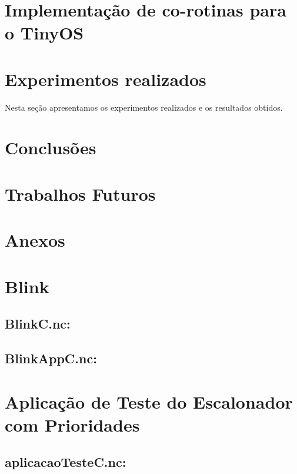 \documentclass[a4paper, 10pt]{article}
\begin{document}
\section{Implementação de co-rotinas para o TinyOS}


\section{Experimentos realizados}\label{resultados}
Nesta seção apresentamos os experimentos realizados e os resultados obtidos.



\section{Conclusões}\label{conclusoes}


\section{Trabalhos Futuros}
\section{Anexos}
\appendix
\section{Blink}\label{a:Blink}
\subsection{BlinkC.nc:}


\subsection{BlinkAppC.nc:}


\section{Aplicação de Teste do Escalonador com Prioridades}\label{a:appTeste}
\subsection{aplicacaoTesteC.nc:}

\end{document}
